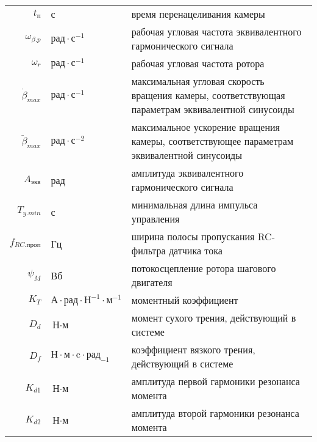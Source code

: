 \begin{table}[ht!]
\begin{tabular}{rll}
    $t_\text{п}$        & с & время перенацеливания камеры \\
    
    $\omega_{\beta.p}$  & $ \text{рад} \cdot \text{с}^{-1} $ & рабочая угловая
                            частота эквивалентного гармонического сигнала \\
    
    $\omega_{r}$ & $ \text{рад} \cdot \text{с}^{-1} $ & рабочая угловая
                            частота ротора \\
    
    $\dot{\beta}_{max}$ & $\text{рад} \cdot \text{с}^{-1}$ & максимальная угловая
                            скорость вращения камеры, соответствующая параметрам эквивалентной синусоиды \\
    
    $\ddot{\beta}_{max}$ & $ \text{рад} \cdot \text{с}^{-2} $ & максимальное ускорение
                            вращения камеры, соответствующее параметрам эквивалентной синусоиды \\
    
    $A_{\text{экв}}$     & рад & амплитуда эквивалентного гармонического сигнала \\
    
    $T_{y.min}$          & с & минимальная длина импульса управления \\
    
    $f_{RC.\text{проп}}$ & Гц & ширина полосы пропускания RC-фильтра датчика тока \\
    
    $\psi_{M}$           & Вб & потокосцепление ротора шагового двигателя \\
    
    $K_{T}$              & $\text{А} \cdot \text{рад} \cdot \text{Н}^{-1} \cdot \text{м}^{-1}$ & моментный коэффициент \\
    
    $D_{d}$ & $\text{Н} \cdot \text{м}$ & момент сухого трения, действующий в системе \\

    $D_{f}$ & $\text{Н} \cdot \text{м} \cdot \text{c} \cdot \text{рад}_{-1}$ & коэффициент вязкого трения, действующий в системе \\
    
    $K_{d1}$ & $\text{Н} \cdot \text{м}$ & амплитуда первой гармоники резонанса момента \\

    $K_{d2}$ & $\text{Н} \cdot \text{м}$ & амплитуда второй гармоники резонанса момента \\


\end{tabular}
\end{table}

